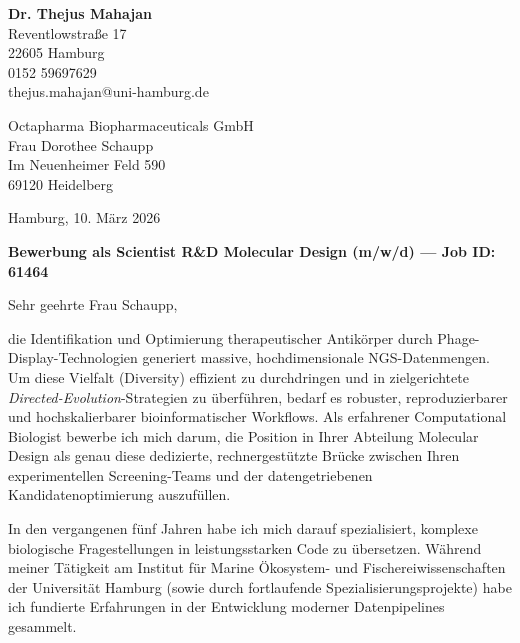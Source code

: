 \documentclass[9pt, a4paper]{extarticle}
\begin{document}
\begin{flushleft}
\textbf{Dr. Thejus Mahajan}\\
Reventlowstra{\ss}e 17\\
22605 Hamburg\\
0152 59697629\\
thejus.mahajan@uni-hamburg.de
\end{flushleft}

\vspace{1.5cm}

\begin{flushleft}
Octapharma Biopharmaceuticals GmbH\\
Frau Dorothee Schaupp\\
Im Neuenheimer Feld 590\\
69120 Heidelberg
\end{flushleft}

\begin{flushright}
Hamburg, 10. M\"arz 2026
\end{flushright}

\vspace{0.5cm}

\textbf{Bewerbung als Scientist R\&D Molecular Design (m/w/d) --- Job ID: 61464}

\vspace{0.5cm}

Sehr geehrte Frau Schaupp,

die Identifikation und Optimierung therapeutischer Antikörper durch Phage-Display-Technologien generiert massive, hochdimensionale NGS-Datenmengen. Um diese Vielfalt (Diversity) effizient zu durchdringen und in zielgerichtete \textit{Directed-Evolution}-Strategien zu überführen, bedarf es robuster, reproduzierbarer und hochskalierbarer bioinformatischer Workflows. Als erfahrener Computational Biologist bewerbe ich mich darum, die Position in Ihrer Abteilung Molecular Design als genau diese dedizierte, rechnergestützte Brücke zwischen Ihren experimentellen Screening-Teams und der datengetriebenen Kandidatenoptimierung auszufüllen.

In den vergangenen fünf Jahren habe ich mich darauf spezialisiert, komplexe biologische Fragestellungen in leistungsstarken Code zu übersetzen. Während meiner Tätigkeit am Institut für Marine Ökosystem- und Fischereiwissenschaften der Universität Hamburg (sowie durch fortlaufende Spezialisierungsprojekte) habe ich fundierte Erfahrungen in der Entwicklung moderner Datenpipelines gesammelt. 
\end{document}
